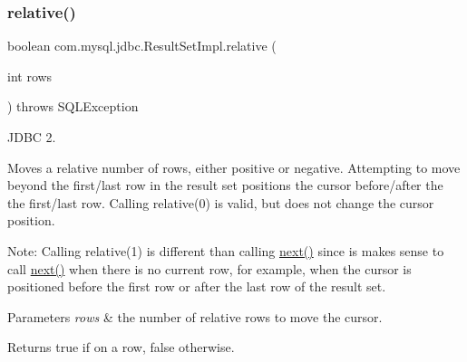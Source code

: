 \subsubsection{\texorpdfstring{relative()}{relative()}}
{\footnotesize\ttfamily boolean com.\+mysql.\+jdbc.\+Result\+Set\+Impl.\+relative (\begin{DoxyParamCaption}\item[{int}]{rows }\end{DoxyParamCaption}) throws S\+Q\+L\+Exception}

J\+D\+BC 2.

Moves a relative number of rows, either positive or negative. Attempting to move beyond the first/last row in the result set positions the cursor before/after the the first/last row. Calling relative(0) is valid, but does not change the cursor position. 

Note\+: Calling relative(1) is different than calling \mbox{\hyperlink{classcom_1_1mysql_1_1jdbc_1_1_result_set_impl_af9c00327ccf944cdcca7b610b69c5f26}{next()}} since is makes sense to call \mbox{\hyperlink{classcom_1_1mysql_1_1jdbc_1_1_result_set_impl_af9c00327ccf944cdcca7b610b69c5f26}{next()}} when there is no current row, for example, when the cursor is positioned before the first row or after the last row of the result set. 


\begin{DoxyParams}{Parameters}
{\em rows} & the number of relative rows to move the cursor.\\
\hline
\end{DoxyParams}
\begin{DoxyReturn}{Returns}
true if on a row, false otherwise.
\end{DoxyReturn}

